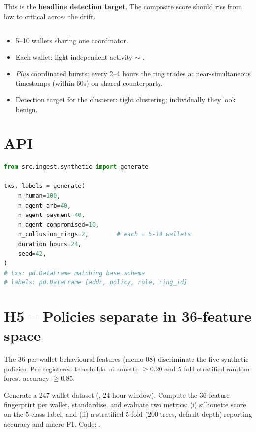 \documentclass[11pt]{article}
\begin{document}
This is the \textbf{headline detection target}. The composite score should
rise from low to critical across the drift.

\subsection*{}
\begin{itemize}
  \item 5--10 wallets sharing one coordinator.
  \item Each wallet: light independent activity $\sim$ .
  \item \emph{Plus} coordinated bursts: every 2--4 hours the ring trades at
    near-simultaneous timestamps (within 60s) on shared counterparty.
  \item Detection target for the clusterer: tight clustering; individually
    they look benign.
\end{itemize}

\section{API}

\begin{lstlisting}[language=Python]
from src.ingest.synthetic import generate

txs, labels = generate(
    n_human=100,
    n_agent_arb=40,
    n_agent_payment=40,
    n_agent_compromised=10,
    n_collusion_rings=2,        # each = 5-10 wallets
    duration_hours=24,
    seed=42,
)
# txs: pd.DataFrame matching base schema
# labels: pd.DataFrame [addr, policy, role, ring_id]
\end{lstlisting}

\section{H5 -- Policies separate in 36-feature space}

\begin{hypothesis}
The 36 per-wallet behavioural features (memo 08) discriminate the five
synthetic policies. Pre-registered thresholds: silhouette $\geq 0.20$ and
5-fold stratified random-forest accuracy $\geq 0.85$.
\end{hypothesis}

\begin{experiment}
Generate a 247-wallet dataset (, 24-hour window). Compute the
36-feature fingerprint per wallet, standardise, and evaluate two metrics:
(i) silhouette score on the 5-class label, and (ii) a stratified 5-fold
 (200 trees, default depth) reporting accuracy
and macro-F1. Code: .
\end{experiment}
\end{document}
